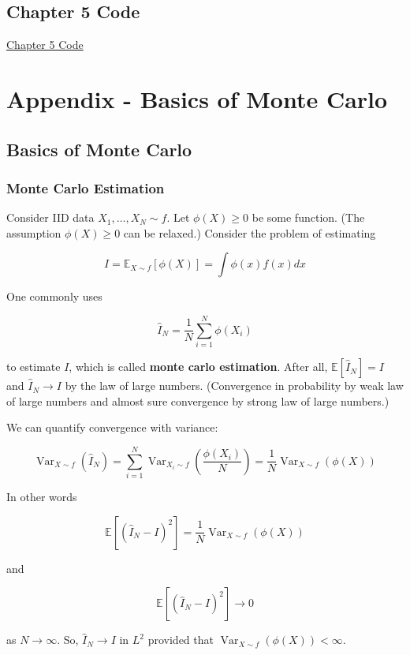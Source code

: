 \documentclass{report}
\begin{document}
\chapter*{Chapter 5 Code}

\href{https://drive.google.com/file/d/1JM5k-e6LkhZ0vXRlfROWpiuw4YC85Jv1/view?usp=sharing}{Chapter 5 Code}

\part*{Appendix - Basics of Monte Carlo}

\chapter{Basics of Monte Carlo}

\section{Monte Carlo Estimation}

\begin{definition}
    Consider IID data $X_{1}, \ldots, X_{N} \sim f$.
    Let $\phi(X) \geq 0$ be some function. (The assumption $\phi(X) \geq 0$ can be relaxed.)
    Consider the problem of estimating

    $$
    I=\mathbb{E}_{X \sim f}[\phi(X)]=\int \phi(x) f(x) d x
    $$

    One commonly uses

    $$
    \hat{I}_{N}=\frac{1}{N} \sum_{i=1}^{N} \phi\left(X_{i}\right)
    $$

    to estimate $I$, which is called \textbf{monte carlo estimation}.
    After all, $\mathbb{E}\left[\hat{I}_{N}\right]=I$ and $\hat{I}_{N} \rightarrow I$ by the law of large numbers.
    (Convergence in probability by weak law of large numbers and almost sure convergence by strong law of large numbers.)
\end{definition}

\begin{concept}
    We can quantify convergence with variance:

    $$
    \operatorname{Var}_{X \sim f}\left(\hat{I}_{N}\right)=\sum_{i=1}^{N} \operatorname{Var}_{X_{i} \sim f}\left(\frac{\phi\left(X_{i}\right)}{N}\right)=\frac{1}{N} \operatorname{Var}_{X \sim f}(\phi(X))
    $$

    In other words

    $$
    \mathbb{E}\left[\left(\hat{I}_{N}-I\right)^{2}\right]=\frac{1}{N} \operatorname{Var}_{X \sim f}(\phi(X))
    $$

    and

    $$
    \mathbb{E}\left[\left(\hat{I}_{N}-I\right)^{2}\right] \rightarrow 0
    $$

    as $N \rightarrow \infty$.
    So, $\hat{I}_{N} \rightarrow I$ in $L^2$ provided that $\operatorname{Var}_{X \sim f}(\phi(X)) < \infty$.
\end{concept}
\end{document}
